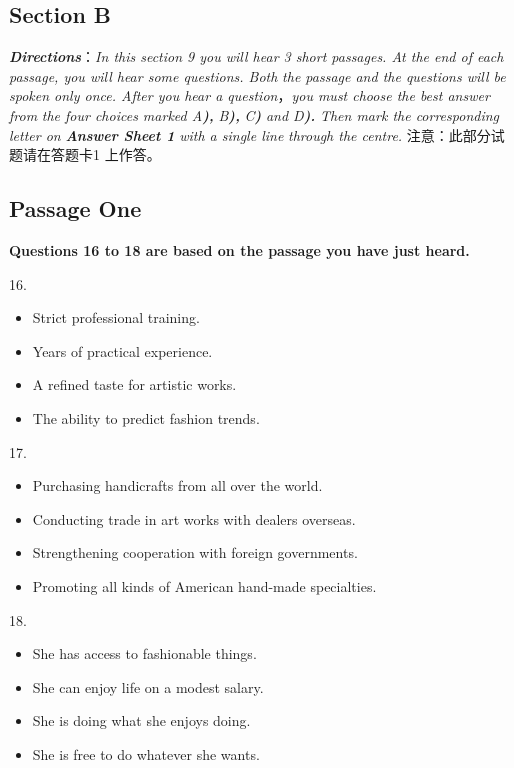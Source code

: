 \documentclass[UTF8,11pt]{ctexart}
\begin{document}
\subsection*{\textbf{Section B}}


\textbf{\textit{Directions}}：\textit{In this section 9 you will hear 3 short passages. At the end of each passage, you will hear some questions. Both} \textit{the passage and the questions will be spoken only once. After you hear a question}，\textit{you must choose the best answer from} \textit{the four choices marked A}\textbf{\textit{),}}\textit{ B}\textbf{\textit{),}}\textit{ C}\textbf{\textit{)}}\textit{ and D}\textbf{\textit{).}}\textit{ Then mark the corresponding letter on}\textbf{\textit{ Answer Sheet 1}}\textit{ with a single line} \textit{through the centre.} 注意：此部分试题请在答题卡1 上作答。


\subsection*{\textbf{Passage One}}


\textbf{Questions 16 to 18 are based on the passage you have just heard.}


16.


\begin{itemize}[leftmargin=2em,itemsep=.2em,topsep=.4em]\item[A.] Strict professional training.
\item[B.] Years of practical experience.
\item[C.] A refined taste for artistic works.
\item[D.] The ability to predict fashion trends.
\end{itemize}

17.


\begin{itemize}[leftmargin=2em,itemsep=.2em,topsep=.4em]\item[A.] Purchasing handicrafts from all over the world.
\item[B.] Conducting trade in art works with dealers overseas.
\item[C.] Strengthening cooperation with foreign governments.
\item[D.] Promoting all kinds of American hand-made specialties.
\end{itemize}

18.


\begin{itemize}[leftmargin=2em,itemsep=.2em,topsep=.4em]\item[A.] She has access to fashionable things.
\item[B.] She can enjoy life on a modest salary.
\item[C.] She is doing what she enjoys doing.
\item[D.] She is free to do whatever she wants.
\end{itemize}
\end{document}
